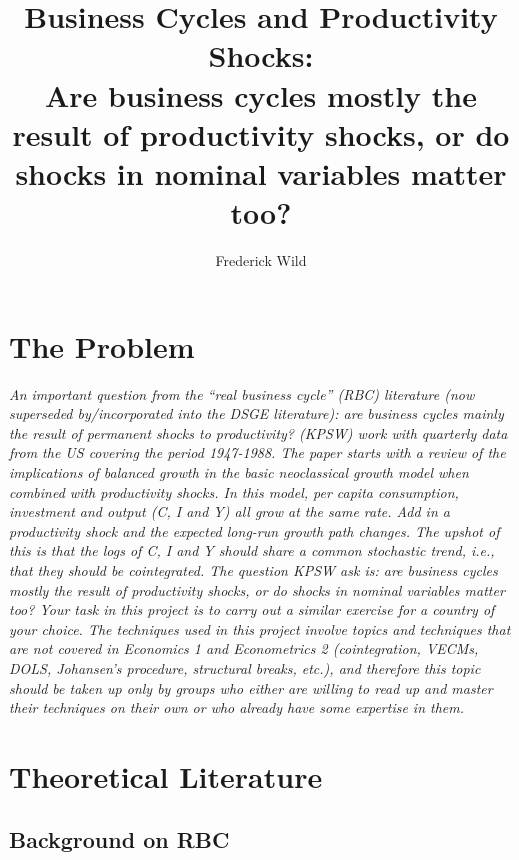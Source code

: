 


\title{Business Cycles and Productivity Shocks:\\ Are business cycles mostly the result of productivity shocks, or do shocks in nominal variables matter
too?}\author{Frederick Wild}\maketitle

\section{The Problem}


\textit{An important question from the “real business cycle” (RBC) literature (now superseded by/incorporated into the DSGE literature): are business cycles mainly
the result of permanent shocks to productivity? \cite{king_stochastic_1987} (KPSW) work with quarterly data from the US covering the period 1947-1988. The paper
starts with a review of the implications of balanced growth in the basic neoclassical growth model when combined with productivity shocks. In this model, per capita
consumption, investment and output (C, I and Y) all grow at the same rate. Add in a productivity shock and the expected long-run growth path changes. The upshot of
this is that the logs of C, I and Y should share a common stochastic trend, i.e., that they should be cointegrated. The question KPSW ask is: are business cycles
mostly the result of productivity shocks, or do shocks in nominal variables matter too? Your task in this project is to carry out a similar exercise for a country of
your choice. The techniques used in this project involve topics and techniques that are not covered in Economics 1 and Econometrics 2 (cointegration, VECMs, DOLS,
Johansen’s procedure, structural breaks, etc.), and therefore this topic should be taken up only by groups who either are willing to read up and master their
techniques on their own or who already have some expertise in them.}

\section{Theoretical Literature}

\subsection{Background on RBC}

